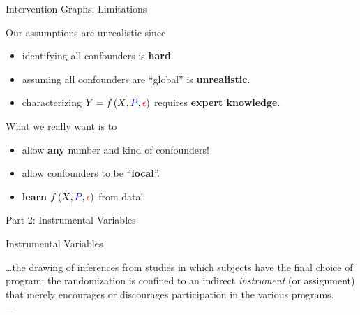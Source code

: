\documentclass[xcolor={dvipsnames}]{beamer}
\newcommand{\policy}{\mbox{\textcolor{blue}{$P$}}}
\newcommand{\response}{\mbox{\textcolor{black}{$Y$}}}
\newcommand{\confounder}{\mbox{\textcolor{red}{$\epsilon$}}}
\newcommand{\features}{\mbox{\textcolor{black}{$X$}}}
\begin{document}
    \begin{frame}{Intervention Graphs: Limitations}

        {\large Our assumptions are unrealistic since }
        \begin{itemize}
            \item identifying all confounders is \textbf{hard}.
            \item assuming all confounders are ``global'' is \textbf{unrealistic}.
            \item characterizing \( \response{} = f\,(\features{}, \policy{}, \confounder{}) \) requires \textbf{expert knowledge}.
        \end{itemize}

        \vspace{0.5cm}
        \large{ What we really want is to }
        \begin{itemize}
            \item allow \textbf{any} number and kind of confounders!
            \item allow confounders to be ``\textbf{local}''.
            \item \textbf{learn} \(f \,(\features{}, \policy{}, \confounder{}) \) from data!
        \end{itemize}
    \end{frame}

    \begin{frame}
        \begin{center}
            \Huge Part 2: Instrumental Variables
        \end{center}
    \end{frame}

    \begin{frame}{Instrumental Variables}

        \begin{center}
            \Large \ldots the drawing of inferences from studies in which subjects have the final choice of program; the randomization is confined to an indirect \emph{instrument} (or assignment) that merely encourages or discourages participation in the various programs. \\
            ---~\citet{pearl2009causality}
        \end{center}

    \end{frame}
\end{document}
